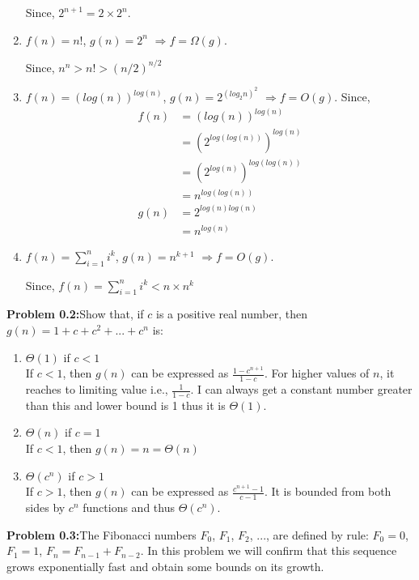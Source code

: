 \documentclass[11pt]{article}
\begin{document}
\begin{enumerate}[label=(\alph*)]
		Since, $2^{n+1} = 2\times 2^n$.
		
		\item $f(n) = n!$, $g(n) = 2^n$ $\Rightarrow f = \Omega(g)$.
		
		Since, $ n^n > n! > (n/2)^{n/2}$
		
		\item $f(n) = (log(n))^{log(n)}$, $g(n) = 2^{(log_2n)^2}$ $\Rightarrow f = O(g)$.
		Since,
		\begin{align*}
		f(n) &= (log(n))^{log(n)}\\
		&= (2^{log(log(n))})^{log(n)}\\
		&= (2^{log(n)})^{log(log(n))}\\
		&= n^{log(log(n))}\\
		g(n) &= 2^{log(n)log(n)}\\
		&= n^{log(n)}
		\end{align*}
		
		\item $f(n) = \sum_{i=1}^ni^k$, $g(n) = n^{k+1}$ $\Rightarrow f = O(g)$.
		
		Since, $f(n) = \sum_{i=1}^ni^k < n\times n^k$
		
	\end{enumerate}
	
	\textbf{Problem 0.2:}Show that, if $c$ is a positive real number, then $g(n) = 1 + c + c^2 + ... + c^n$ is:
	
	\begin{enumerate}[label=(\alph*)]
		\item $\Theta(1)$ if $c < 1$\\
		If $c<1$, then $g(n)$ can be expressed as $\frac{1-c^{n+1}}{1-c}$. For higher values of $n$, it reaches to limiting value i.e., $\frac{1}{1-c}$. I can always get a constant 
		number greater than this and lower bound is 1 thus it is $\Theta(1)$. 
		
		\item $\Theta(n)$ if $c = 1$\\
		If $c<1$, then $g(n) = n = \Theta(n)$
		
		\item $\Theta(c^n)$ if $c > 1$\\
		If $c>1$, then $g(n)$ can be expressed as $\frac{c^{n+1}-1}{c-1}$. It is bounded from both sides by $c^n$ functions and thus $\Theta(c^n)$.
	\end{enumerate}
	
	\textbf{Problem 0.3:}The Fibonacci numbers $F_0$, $F_1$, $F_2$, ..., are defined by rule: $F_0 = 0$, $F_1 = 1$, $F_n = F_{n-1} + F_{n-2}$. In this problem we will confirm that this sequence grows exponentially fast and obtain some bounds on its growth.
	
\end{document}
